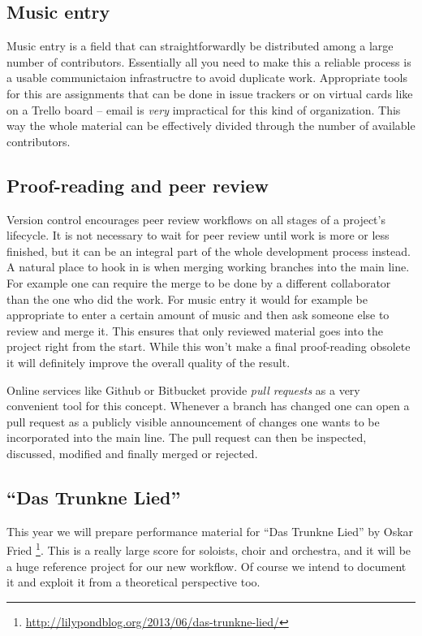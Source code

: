 \documentclass[11pt,a4paper]{article}
\begin{document}
\subsection{Music entry}
Music entry is a field that can straightforwardly be distributed among a large number
of contributors. Essentially all you need to make this a reliable process is a usable
communictaion infrastructre to avoid duplicate work.
Appropriate tools for this are assignments that can be done in issue trackers or on
virtual cards like on a Trello board -- email is \emph{very} impractical for this kind
of organization. This way the whole material can be effectively divided through the number
of available contributors.

\subsection{Proof-reading and peer review}\label{sec:proof-reading-and-peer-review}
Version control encourages peer review workflows on all stages of a project's lifecycle.
It is not necessary to wait for peer review until work is more or less finished, but it
can be an integral part of the whole development process instead. A natural place to hook
in is when merging working branches into the main line. For example one can require the
merge to be done by a different collaborator than the one who did the work. For music entry
it would for example be appropriate to enter a certain amount of music and then ask someone
else to review and merge it.
This ensures that only reviewed material goes into the project right from the
start. While this won't make a final proof-reading obsolete it will definitely improve
the overall quality of the result.

Online services like Github or Bitbucket provide \emph{pull requests} as a very convenient
tool for this concept. Whenever a branch has changed one can open a pull request as a
publicly visible announcement of changes one wants to be incorporated into the main line.
The pull request can then be inspected, discussed, modified and finally merged or rejected.

\subsection{“Das Trunkne Lied”}
This year we will prepare performance material for “Das Trunkne Lied” by Oskar Fried%
\footnote{\url{http://lilypondblog.org/2013/06/das-trunkne-lied/}}.
This is a really large score for soloists, choir and orchestra, and it will be a
huge reference project for our new workflow. Of course we intend to document it
and exploit it from a theoretical perspective too.
\end{document}
